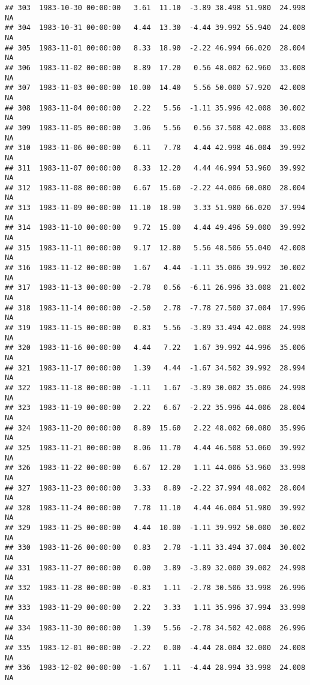 \documentclass{article}\usepackage{graphicx, color}
\makeatletter
\newenvironment{kframe}{%
 \def\at@end@of@kframe{}%
 \ifinner\ifhmode%
  \def\at@end@of@kframe{\end{minipage}}%
  \begin{minipage}{\columnwidth}%
 \fi\fi%
 \def\FrameCommand##1{\hskip\@totalleftmargin \hskip-\fboxsep
 \colorbox{shadecolor}{##1}\hskip-\fboxsep
     \hskip-\linewidth \hskip-\@totalleftmargin \hskip\columnwidth}%
 \MakeFramed {\advance\hsize-\width
   \@totalleftmargin\z@ \linewidth\hsize
   \@setminipage}}%
 {\par\unskip\endMakeFramed%
 \at@end@of@kframe}
\newenvironment{knitrout}{}{} %
\makeatother
\begin{document}
\begin{knitrout}
\begin{kframe}
\begin{verbatim}
## 303  1983-10-30 00:00:00   3.61  11.10  -3.89 38.498 51.980  24.998     NA
## 304  1983-10-31 00:00:00   4.44  13.30  -4.44 39.992 55.940  24.008     NA
## 305  1983-11-01 00:00:00   8.33  18.90  -2.22 46.994 66.020  28.004     NA
## 306  1983-11-02 00:00:00   8.89  17.20   0.56 48.002 62.960  33.008     NA
## 307  1983-11-03 00:00:00  10.00  14.40   5.56 50.000 57.920  42.008     NA
## 308  1983-11-04 00:00:00   2.22   5.56  -1.11 35.996 42.008  30.002     NA
## 309  1983-11-05 00:00:00   3.06   5.56   0.56 37.508 42.008  33.008     NA
## 310  1983-11-06 00:00:00   6.11   7.78   4.44 42.998 46.004  39.992     NA
## 311  1983-11-07 00:00:00   8.33  12.20   4.44 46.994 53.960  39.992     NA
## 312  1983-11-08 00:00:00   6.67  15.60  -2.22 44.006 60.080  28.004     NA
## 313  1983-11-09 00:00:00  11.10  18.90   3.33 51.980 66.020  37.994     NA
## 314  1983-11-10 00:00:00   9.72  15.00   4.44 49.496 59.000  39.992     NA
## 315  1983-11-11 00:00:00   9.17  12.80   5.56 48.506 55.040  42.008     NA
## 316  1983-11-12 00:00:00   1.67   4.44  -1.11 35.006 39.992  30.002     NA
## 317  1983-11-13 00:00:00  -2.78   0.56  -6.11 26.996 33.008  21.002     NA
## 318  1983-11-14 00:00:00  -2.50   2.78  -7.78 27.500 37.004  17.996     NA
## 319  1983-11-15 00:00:00   0.83   5.56  -3.89 33.494 42.008  24.998     NA
## 320  1983-11-16 00:00:00   4.44   7.22   1.67 39.992 44.996  35.006     NA
## 321  1983-11-17 00:00:00   1.39   4.44  -1.67 34.502 39.992  28.994     NA
## 322  1983-11-18 00:00:00  -1.11   1.67  -3.89 30.002 35.006  24.998     NA
## 323  1983-11-19 00:00:00   2.22   6.67  -2.22 35.996 44.006  28.004     NA
## 324  1983-11-20 00:00:00   8.89  15.60   2.22 48.002 60.080  35.996     NA
## 325  1983-11-21 00:00:00   8.06  11.70   4.44 46.508 53.060  39.992     NA
## 326  1983-11-22 00:00:00   6.67  12.20   1.11 44.006 53.960  33.998     NA
## 327  1983-11-23 00:00:00   3.33   8.89  -2.22 37.994 48.002  28.004     NA
## 328  1983-11-24 00:00:00   7.78  11.10   4.44 46.004 51.980  39.992     NA
## 329  1983-11-25 00:00:00   4.44  10.00  -1.11 39.992 50.000  30.002     NA
## 330  1983-11-26 00:00:00   0.83   2.78  -1.11 33.494 37.004  30.002     NA
## 331  1983-11-27 00:00:00   0.00   3.89  -3.89 32.000 39.002  24.998     NA
## 332  1983-11-28 00:00:00  -0.83   1.11  -2.78 30.506 33.998  26.996     NA
## 333  1983-11-29 00:00:00   2.22   3.33   1.11 35.996 37.994  33.998     NA
## 334  1983-11-30 00:00:00   1.39   5.56  -2.78 34.502 42.008  26.996     NA
## 335  1983-12-01 00:00:00  -2.22   0.00  -4.44 28.004 32.000  24.008     NA
## 336  1983-12-02 00:00:00  -1.67   1.11  -4.44 28.994 33.998  24.008     NA

\end{verbatim}
\end{kframe}
\end{knitrout}
\end{document}
